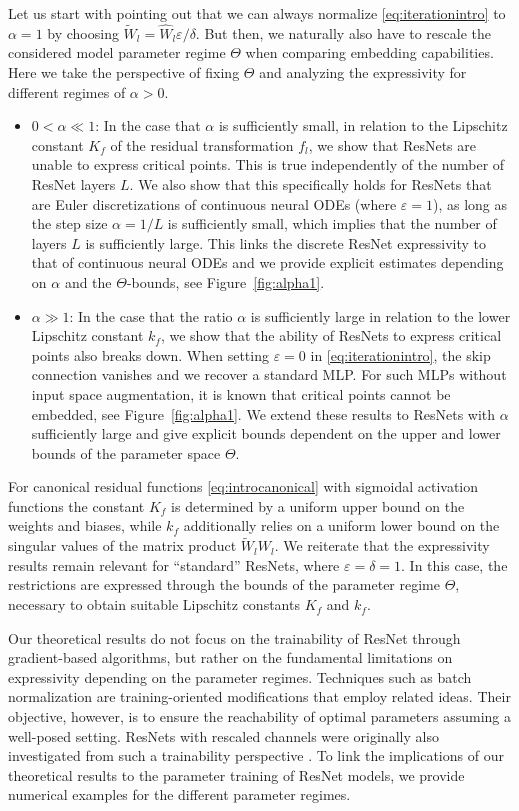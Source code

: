 \documentclass[10pt]{article}
\theoremstyle{definition}
\numberwithin{equation}{section}
\newcommand{\eps}{\varepsilon}
\newcommand{\Wt}{\widetilde{W}}
\begin{document}
Let us start with pointing out that we can always normalize \eqref{eq:iterationintro} to $\alpha = 1$ by choosing $\Wt_l = \hat{W}_l \eps / \delta$. But then, we naturally also have to rescale the considered model parameter regime $\Theta$ when comparing embedding capabilities. Here we take the perspective of fixing $\Theta$ and analyzing the expressivity for different regimes of $\alpha> 0$.  
\begin{itemize}
    \item \emph{$0< \alpha \ll 1$}: In the case that $\alpha$ is sufficiently small, in relation to the Lipschitz constant $K_f$ of the residual transformation $f_l$, we show that ResNets are unable to express critical points. This is true independently of the number of ResNet layers $L$. We also show that this specifically holds for ResNets that are Euler discretizations of continuous neural ODEs (where $\eps = 1$), as long as the step size $\alpha = 1/L$ is sufficiently small, which implies that the number of layers $L$ is sufficiently large. This links the discrete ResNet expressivity to that of continuous neural ODEs and we provide explicit estimates depending on $\alpha$ and the $\Theta$-bounds, see Figure~\ref{fig:alpha1}.
\item \emph{$\alpha \gg 1$}:
In the case that the ratio $\alpha$ is sufficiently large in relation to the lower Lipschitz constant $k_f$, we show that the ability of ResNets to express critical points also breaks down. When setting $\eps = 0$ in \eqref{eq:iterationintro}, the skip connection vanishes and we recover a standard MLP. For such MLPs without input space augmentation, it is known that critical points cannot be embedded, see Figure~\ref{fig:alpha1}. We extend these results to ResNets with $\alpha$ sufficiently large and give explicit bounds dependent on the upper and lower bounds of the parameter space $\Theta$.
\end{itemize}
For canonical residual functions \eqref{eq:introcanonical} with sigmoidal activation functions the constant $K_f$ is determined by a uniform upper bound on the weights and biases, while $k_f$ additionally relies on a uniform lower bound on the singular values of the matrix product $\Wt_l W_l$.
We reiterate that the expressivity results remain relevant for ``standard'' ResNets, where $\eps = \delta = 1$. In this case, the restrictions are expressed through the bounds of the parameter regime $\Theta$, necessary to obtain suitable Lipschitz constants $K_f$ and $k_f$.
    
Our theoretical results do not focus on the trainability of ResNet through gradient-based algorithms, but rather on the fundamental limitations on expressivity depending on the parameter regimes. Techniques such as batch normalization are training-oriented modifications that employ related ideas. Their objective, however, is to ensure the reachability of optimal parameters assuming a well-posed setting. ResNets with rescaled channels were originally also investigated from such a trainability perspective \cite{he16}. To link the implications of our theoretical results to the parameter training of ResNet models, we provide numerical examples for the different parameter regimes.
\end{document}
